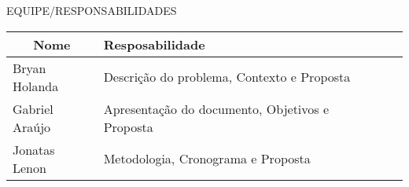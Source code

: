 		
	\begin{center}	
		EQUIPE/RESPONSABILIDADES


		\begin{table}[h]
		\centering
		\begin{tabular}{lllll}
		\hline
		\multicolumn{1}{c}{Nome} & Resposabilidade &  &  &  \\ \hline
		Bryan Holanda            &  Descrição do problema, Contexto e Proposta   &  &  &  \\ \hline
		Gabriel Araújo           & Apresentação do documento, Objetivos e Proposta    &  &  &  \\ \hline
		Jonatas Lenon           &  Metodologia, Cronograma e Proposta          &  &  &  \\ \hline
		\end{tabular}
		\end{table}
	\end{center}
